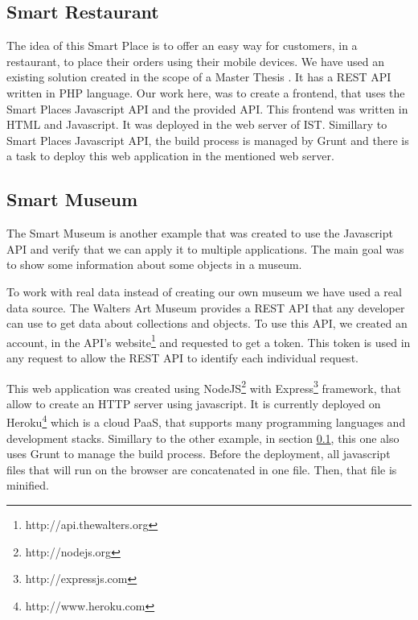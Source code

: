\subsection{Smart Restaurant}
\label{sub:implementation_smart_restaurant}
The idea of this Smart Place is to offer an easy way for customers, in a restaurant, to place their orders using their mobile devices.
We have used an existing solution created in the scope of a Master Thesis \cite{SLOC}.
It has a \gls{REST} \gls{API} written in \gls{PHP} language.
Our work here, was to create a frontend, that uses the Smart Places Javascript \gls{API} and the provided \gls{API}.
This frontend was written in \gls{HTML} and Javascript.
It was deployed in the web server of \gls{IST}. Simillary to Smart Places Javascript \gls{API}, the build process is managed by Grunt and there is a task to deploy this web application in the mentioned web server.

\subsection{Smart Museum}
\label{sub:implementation_smart_museum}
The Smart Museum is another example that was created to use the Javascript \gls{API} and verify that we can apply it to multiple applications.
The main goal was to show some information about some objects in a museum.

To work with real data instead of creating our own museum we have used a real data source.
The Walters Art Museum provides a \gls{REST} \gls{API} that any developer can use to get data about collections and objects.
To use this \gls{API}, we created an account, in the \gls{API}'s website\footnote{http://api.thewalters.org} and requested to get a token. This token is used in any request to allow the \gls{REST} \gls{API} to identify each individual request.

This web application was created using NodeJS\footnote{http://nodejs.org} with Express\footnote{http://expressjs.com} framework, that allow to create an \gls{HTTP} server using javascript.
It is currently deployed on Heroku\footnote{http://www.heroku.com} which is a cloud \gls{PaaS}, that supports many programming languages and development stacks.
Simillary to the other example, in section \ref{sub:implementation_smart_restaurant}, this one also uses Grunt to manage the build process. Before the deployment, all javascript files that will run on the browser are concatenated in one file. Then, that file is minified.
